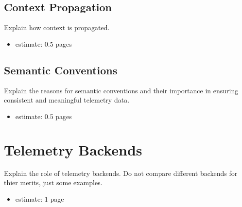 \subsection{Context Propagation}

Explain how context is propagated.

\begin{itemize}
    \item estimate: 0.5 pages
\end{itemize}

\subsection{Semantic Conventions}

Explain the reasons for semantic conventions and their importance in ensuring consistent and meaningful telemetry data.

\begin{itemize}
    \item estimate: 0.5 pages
\end{itemize}

\section{Telemetry Backends}
\label{sec:o_telemetry_backends}

Explain the role of telemetry backends. Do not compare different backends for thier merits, just some examples.

\begin{itemize}
    \item estimate: 1 page
\end{itemize}
